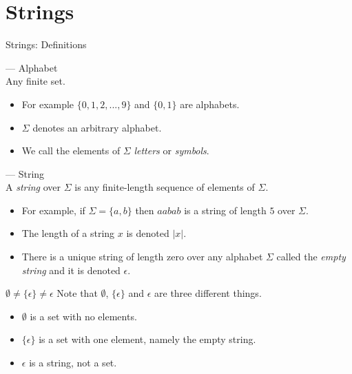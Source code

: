 \section[slide=true,tocsection=false]{Strings}
\begin{slide}[bm=,toc=]{Strings: Definitions}
\pause
\begin{defn}{--- Alphabet}~\\
\pause Any finite set. 
\end{defn}
\vspace{-5mm}
\begin{itemize}
\item<4-> For example $\{0,1,2,...,9\}$ and $\{0,1\}$ are alphabets. 
\item<5->  $\Sigma$ denotes an arbitrary alphabet. 
\item<6->  We call the elements of $\Sigma$ \emph{letters} or \emph{symbols}.
\end{itemize}
\pause[4]
\begin{defn}{--- String}~\\
\pause
A \emph{string} over $\Sigma$ is any finite-length sequence of elements of
$\Sigma$. 
\end{defn}
\vspace{-5mm}

\begin{itemize}
\item<9-> For example, if $\Sigma = \{a,b\}$ then $aabab$ is a string of length $5$ over $\Sigma$.
\item<10-> The length of a string $x$ is denoted $|x|$. 
\item<11-> There is a unique string of length zero over any alphabet $\Sigma$ called
      the \emph{empty string} and it is denoted $\epsilon$.
\end{itemize}
\end{slide}

\begin{slide}[bm=,toc=]{$\emptyset \neq \{\epsilon\} \neq \epsilon$}
    Note that $\emptyset$, $\{\epsilon\}$ and $\epsilon$ are three different things.
    \begin{itemize}
    \item<2-> $\emptyset$ is a set with no elements.
    \item<3-> $\{\epsilon\}$ is a set with one element, namely the empty string.
    \item<4-> $\epsilon$ is a string, not a set.
    \end{itemize}
\end{slide}

